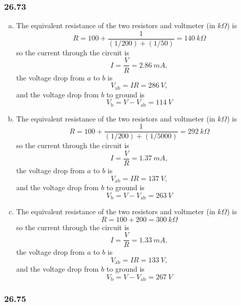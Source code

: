 \documentclass{article}
\begin{document}
\subsubsection{26.73}

\begin{enumerate}[(a)]
  \item The equivalent resistance of the two resistors and voltmeter (in $\unit{k \Omega}$) is \[R = 100 + \frac{1}{(1 / 200) + (1 / 50)} = \qty{140}{k \Omega}\] so the current through the circuit is \[I = \frac{V}{R} = \qty{2.86}{mA},\] the voltage drop from $a$ to $b$ is \[V_\textrm{ab} = I R = \qty{286}{V},\] and the voltage drop from $b$ to ground is \[V_\textrm{b} = V - V_\textrm{ab} = \qty{114}{V}\]

  \item The equivalent resistance of the two resistors and voltmeter (in $\unit{k \Omega}$) is \[R = 100 + \frac{1}{(1 / 200) + (1 / 5000)} = \qty{292}{k \Omega}\] so the current through the circuit is \[I = \frac{V}{R} = \qty{1.37}{mA},\] the voltage drop from $a$ to $b$ is \[V_\textrm{ab} = I R = \qty{137}{V},\] and the voltage drop from $b$ to ground is \[V_\textrm{b} = V - V_\textrm{ab} = \qty{263}{V}\]

  \item The equivalent resistance of the two resistors and voltmeter (in $\unit{k \Omega}$) is \[R = 100 + 200 = \qty{300}{k \Omega}\] so the current through the circuit is \[I = \frac{V}{R} = \qty{1.33}{mA},\] the voltage drop from $a$ to $b$ is \[V_\textrm{ab} = I R = \qty{133}{V},\] and the voltage drop from $b$ to ground is \[V_\textrm{b} = V - V_\textrm{ab} = \qty{267}{V}\]
\end{enumerate}

\subsubsection{26.75}
\end{document}
